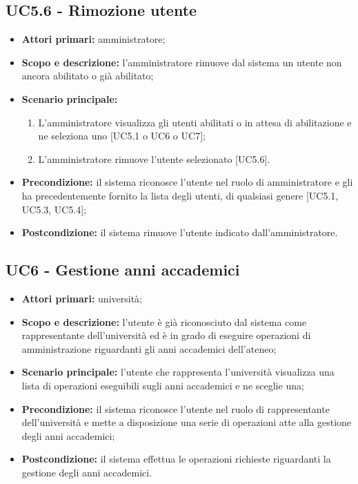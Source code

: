 \documentclass[AnalisiDeiRequisiti.tex]{subfiles}
\begin{document}
\subsection{UC5.6 - Rimozione utente}
\begin{itemize}
	\item \textbf{Attori primari:} amministratore;
	\item \textbf{Scopo e descrizione:} l'amministratore rimuove dal sistema un utente non ancora abilitato o già abilitato;
	\item \textbf{Scenario principale:}
	\begin{enumerate}
		\item L'amministratore visualizza gli utenti abilitati o in attesa di abilitazione e ne seleziona uno [UC5.1 o UC6 o UC7];
		\item L'amministratore rimuove l'utente selezionato [UC5.6].
	\end{enumerate}
	\item \textbf{Precondizione:} il sistema riconosce l'utente nel ruolo di amministratore e gli ha precedentemente fornito la lista degli utenti, di qualsiasi genere [UC5.1, UC5.3, UC5.4];
	\item \textbf{Postcondizione:} il sistema rimuove l'utente indicato dall'amministratore.
\end{itemize}

\subsection{UC6 - Gestione anni accademici}
\begin{itemize}
	\item \textbf{Attori primari:} università;
	\item \textbf{Scopo e descrizione:} l'utente è già riconosciuto dal sistema come rappresentante dell'università ed è in grado di eseguire operazioni di amministrazione riguardanti gli anni accademici dell'ateneo;
	\item \textbf{Scenario principale:} l'utente che rappresenta l'università visualizza una lista di operazioni eseguibili sugli anni accademici e ne sceglie una;
	\item \textbf{Precondizione:} il sistema riconosce l'utente nel ruolo di rappresentante dell'università e mette a disposizione una serie di operazioni atte alla gestione degli anni accademici; 
	\item \textbf{Postcondizione:} il sistema effettua le operazioni richieste riguardanti la gestione degli anni accademici.
\end{itemize}
\end{document}
